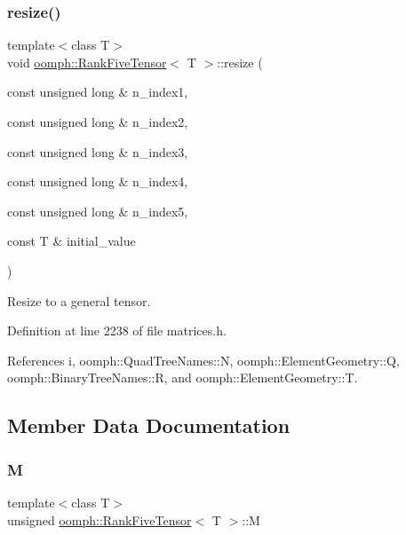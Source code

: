 \subsubsection{\texorpdfstring{resize()}{resize()}\hspace{0.1cm}{\footnotesize\ttfamily [3/3]}}
{\footnotesize\ttfamily template$<$class T$>$ \\
void \hyperlink{classoomph_1_1RankFiveTensor}{oomph\+::\+Rank\+Five\+Tensor}$<$ T $>$\+::resize (\begin{DoxyParamCaption}\item[{const unsigned long \&}]{n\+\_\+index1,  }\item[{const unsigned long \&}]{n\+\_\+index2,  }\item[{const unsigned long \&}]{n\+\_\+index3,  }\item[{const unsigned long \&}]{n\+\_\+index4,  }\item[{const unsigned long \&}]{n\+\_\+index5,  }\item[{const T \&}]{initial\+\_\+value }\end{DoxyParamCaption})\hspace{0.3cm}{\ttfamily [inline]}}



Resize to a general tensor. 



Definition at line 2238 of file matrices.\+h.



References i, oomph\+::\+Quad\+Tree\+Names\+::N, oomph\+::\+Element\+Geometry\+::Q, oomph\+::\+Binary\+Tree\+Names\+::R, and oomph\+::\+Element\+Geometry\+::T.



\subsection{Member Data Documentation}
\mbox{\label{classoomph_1_1RankFiveTensor_a240c4e62ffa0dd3e5dfc3b0063f94c7f}} 
\subsubsection{\texorpdfstring{M}{M}}
{\footnotesize\ttfamily template$<$class T$>$ \\
unsigned \hyperlink{classoomph_1_1RankFiveTensor}{oomph\+::\+Rank\+Five\+Tensor}$<$ T $>$\+::M\hspace{0.3cm}{\ttfamily [private]}}




